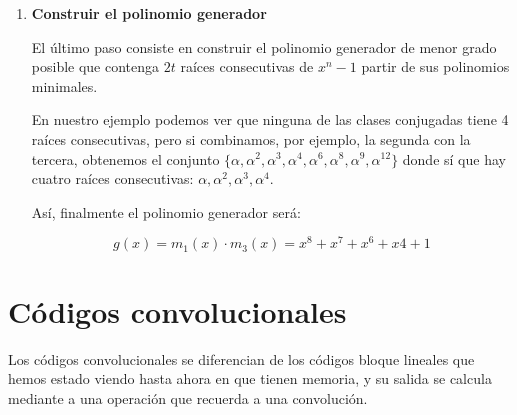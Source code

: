 \documentclass[es,apuntes]{uah}
\begin{document}
{\begin{enumerate}
	Haremos lo mismo para el resto de las raíces, y obtendremos:
	
\begin{center}
\begin{tabular}{ll}
\hline
	Clases conjugadas							& Polinomios minimales \\
	\hline
	$\{\alpha^0\}$								& $m_0(x) = x-1$ \\
	$\{\alpha,\alpha^2,\alpha^4, \alpha^8\}$ 	& $m_1(x) = x_4+x+1$ \\
	$\{\alpha^3,\alpha^6,\alpha^{12}, \alpha^{((24))_{15}} =\alpha^{9}\}$ 	& $m_3(x) = x^4+x^3+x^2+x+1$ \\
	$\{\alpha^5,\alpha^{10}\}$ 	& $m_5(x) = x^2+x+1$ \\
	$\{\alpha^7,\alpha^{14}, \alpha^{((28))_{15}} =\alpha^{13}, \alpha^{((56))_{15}} =\alpha^{11}\}$ 	& $m_7(x) = x^4+x^3+1$ \\
\hline
\end{tabular}
\end{center}
	
	\item {\bf Construir el polinomio generador}
	
	El último paso consiste en construir el polinomio generador de menor grado posible que contenga $2t$ raíces consecutivas de $x^n-1$ partir de sus polinomios minimales. 
	
	En nuestro ejemplo podemos ver que ninguna de las clases conjugadas tiene 4 raíces consecutivas, pero si combinamos, por ejemplo, la segunda con la tercera, obtenemos el conjunto $\{\alpha,\alpha^2,\alpha^3,\alpha^4, \alpha^6, \alpha^8, \alpha^9, \alpha^{12}\}$ donde sí que hay cuatro raíces consecutivas: $\alpha,\alpha^2,\alpha^3,\alpha^4$.
	
	Así, finalmente el polinomio generador será:
	
	\begin{displaymath}
		g(x) = m_1(x)\cdot m_3(x) = x^8+x^7+x^6+x4+1
	\end{displaymath}
	
	 
\end{enumerate}



\section{Códigos convolucionales}

Los códigos convolucionales se diferencian de los códigos bloque lineales que hemos estado viendo hasta ahora en que tienen memoria, y su salida se calcula mediante a una operación que recuerda a una convolución. 

}
\end{document}
